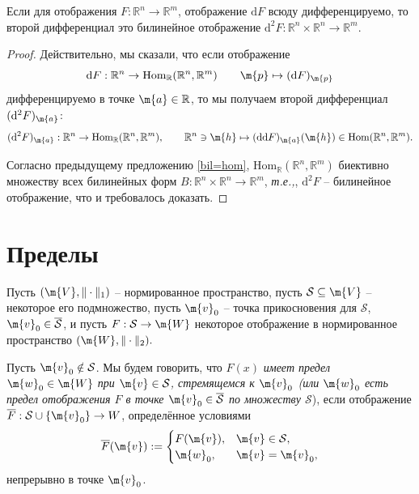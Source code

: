 
\begin{proposition}
    Если для отображения $F:\mathbb{R}^n \to \mathbb{R}^m$, отображение $\mathrm{d}F$ всюду дифференцируемо, то второй дифференциал это билинейное отображение $\mathrm{d}^2F: \mathbb{R}^n \times \mathbb{R}^n \to \mathbb{R}^m.$
\end{proposition}
\begin{proof}
Действительно, мы сказали, что если отображение
\[
 \mathrm{d}F: \mathbb{R}^n\to \mathrm{Hom}_\mathbb{R}(\mathbb{R}^n, \mathbb{R}^m) \qquad \m{p} \mapsto (\mathrm{d}F)_{\m{p}}
\]
дифференцируемо в точке $\m{a} \in \mathbb{R}$, то мы получаем второй дифференциал $(\mathrm{d}^2F)_\m{a}$:
\[
 (\mathrm{d}^2F)_\m{a}: \mathbb{R}^n\to \mathrm{Hom}_\mathbb{R}(\mathbb{R}^n, \mathbb{R}^m), \qquad \mathbb{R}^n \ni \m{h} \mapsto (\mathrm{d}\mathrm{d}F)_\m{a}(\m{h}) \in \mathrm{Hom}(\mathbb{R}^n, \mathbb{R}^m).
\]

Согласно предыдущему предложению \ref{bil=hom}, $\mathrm{Hom}_\mathbb{R}(\mathbb{R}^n, \mathbb{R}^m)$ биективно множеству всех билинейных форм $B:\mathbb{R}^n\times \mathbb{R}^n \to \mathbb{R}^m$, \textit{т.е.,}, $\mathrm{d}^2F$ -- билинейное отображение, что и требовалось доказать.
\end{proof}











\section{Пределы}

Пусть $(\m{V}, \|\cdot\|_1)$ -- нормированное пространство, пусть $\mathcal{S} \subseteq \m{V}$ -- некоторое его подмножество, пусть $\m{v}_0$ -- точка прикосновения для $\mathcal{S}$, \ie $\m{v}_0 \in \overline{\mathcal{S}}$, и пусть $F:\mathcal{S} \to \m{W}$ некоторое отображение в нормированное пространство $(\m{W}, \|\cdot\|_2).$

\begin{definition}\label{the_main_def_of_limit}
Пусть $\m{v}_0 \notin \mathcal{S}$. Мы будем говорить, что $F(x)$ \textit{имеет предел $\m{w}_0 \in \m{W}$ при $\m{v} \in \mathcal{S}$, стремящемся к $\m{v}_0$ (или $\m{w}_0$ есть предел отображения $F$ в точке $\m{v}_0\in \overline{\mathcal{S}}$ по множеству $\mathcal{S}$}), если отображение $\overline{F}:\mathcal{S} \cup \{\m{v}_0\} \to W$, определённое условиями
    \[
     \overline{F}(\m{v}) := \begin{cases}
         F(\m{v}), & \m{v} \in \mathcal{S}, \\
         \m{w}_0, & \m{v} = \m{v}_0,
     \end{cases}
    \]
    непрерывно в точке $\m{v}_0$.
\end{definition}

